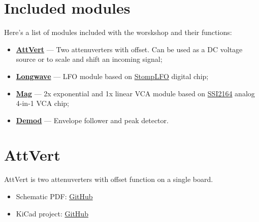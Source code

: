 \documentclass[a4paper,12pt]{article}
\begin{document}
\section{Included modules}

Here's a list of modules included with the worskshop and
their functions:

\begin{itemize}
  \item \hyperref[sec:attvert]{\textbf{AttVert}} --- Two
    attenuverters with offset. Can be used as a DC voltage
    source or to scale and shift an incoming signal;

  \item \hyperref[sec:longwave]{\textbf{Longwave}} --- LFO
    module based on
    \href{https://electricdruid.net/datasheets/STOMPLFODatasheet.pdf}{StompLFO}
    digital chip;

  \item \hyperref[sec:mag]{\textbf{Mag}} --- 2x exponential
    and 1x linear VCA module based on
    \href{https://www.soundsemiconductor.com/downloads/ssi2164datasheet.pdf}{SSI2164}
    analog 4-in-1 VCA chip;

  \item \hyperref[sec:demod]{\textbf{Demod}} --- Envelope
    follower and peak detector.
\end{itemize}

\pagebreak

\section{AttVert}\label{sec:attvert}

AttVert is two attenuverters with offset function on a
single board.

\begin{itemize}
  \item Schematic PDF:
    \href{https://github.com/flpvsk/pedalmarkt-docs/tree/main/elements2-modulation-docs/include}{GitHub}

  \item KiCad project:
    \href{https://github.com/flpvsk/pt-workshop/tree/main/attenuverters}{GitHub}
\end{itemize}
\end{document}
